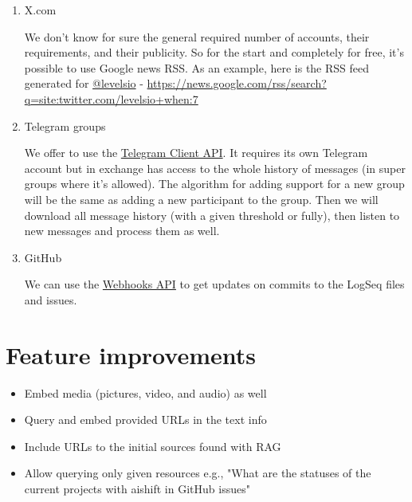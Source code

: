 \documentclass[11pt]{article}
\begin{document}
\begin{enumerate}
\item X.com
\label{sec:orgda10bfc}

We don't know for sure the general required number of accounts, their requirements, and their publicity. So for the start and completely for free, it's possible to use Google news RSS. As an example, here is the RSS feed generated for \href{https://x.com/levelsio}{@levelsio} - \url{https://news.google.com/rss/search?q=site:twitter.com/levelsio+when:7}
\item Telegram groups
\label{sec:orgfccc705}

We offer to use the \href{https://core.telegram.org/\#telegram-api}{Telegram Client API}. It requires its own Telegram account but in exchange has access to the whole history of messages (in super groups where it's allowed). The algorithm for adding support for a new group will be the same as adding a new participant to the group. Then we will download all message history (with a given threshold or fully), then listen to new messages and process them as well.
\item GitHub
\label{sec:org42688db}

We can use the \href{https://docs.github.com/en/webhooks/webhook-events-and-payloads}{Webhooks API} to get updates on commits to the LogSeq files and issues.
\end{enumerate}
\section{Feature improvements}
\label{sec:org07ffb24}

\begin{itemize}
\item Embed media (pictures, video, and audio) as well
\item Query and embed provided URLs in the text info
\item Include URLs to the initial sources found with RAG
\item Allow querying only given resources e.g., "What are the statuses of the current projects with aishift in GitHub issues"
\end{itemize}
\end{document}

